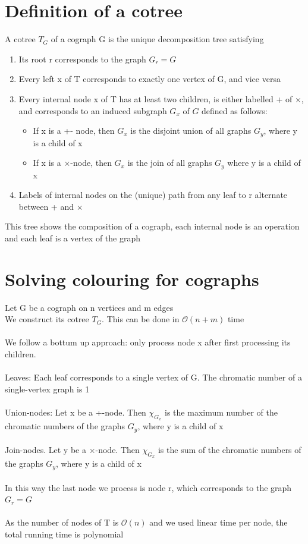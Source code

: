 \documentclass{article}[18pt]
\begin{document}
\section{Definition of a cotree}
A cotree $T_G$ of a cograph G is the unique decomposition tree satisfying
\begin{enumerate}
	\item Its root r corresponds to the graph $G_r=G$
	\item Every left x of T corresponds to exactly one vertex of G, and vice versa
	\item Every internal node x of T has at least two children, is either labelled + of $\times$, and corresponds to an induced subgraph $G_x$ of $G$ defined as follows:
	\begin{itemize}
		\item If x is a +- node, then $G_x$ is the disjoint union of all graphs $G_y$, where y is a child of x
		\item If x is a $\times$-node, then $G_x$ is the join of all graphs $G_y$ where y is a child of x
	\end{itemize}
	\item Labels of internal nodes on the (unique) path from any leaf to r alternate between + and $\times$
\end{enumerate}
This tree shows the composition of a cograph, each internal node is an operation and each leaf is a vertex of the graph
\section{Solving colouring for cographs}
Let G be a cograph on n vertices and m edges\\
We construct its cotree $T_G$. This can be done in $\mathcal{O}(n+m)$ time\\
\\
We follow a bottum up approach: only process node x after first processing its children.\\
\\
Leaves: Each leaf corresponds to a single vertex of G. The chromatic number of a single-vertex graph is 1\\
\\
Union-nodes: Let x be a +-node. Then $\chi_{G_x}$ is the maximum number of the chromatic numbers of the graphs $G_y$, where y is a child of x\\
\\
Join-nodes. Let y be a $\times$-node. Then $\chi_{G_x}$ is the sum of the chromatic numbers of the graphs $G_y$, where y is a child of x\\
\\
In this way the last node we process is node r, which corresponds to the graph $G_r=G$\\
\\
As the number of nodes of T is $\mathcal{O}(n)$ and we used linear time per node, the total running time is polynomial
\end{document}
